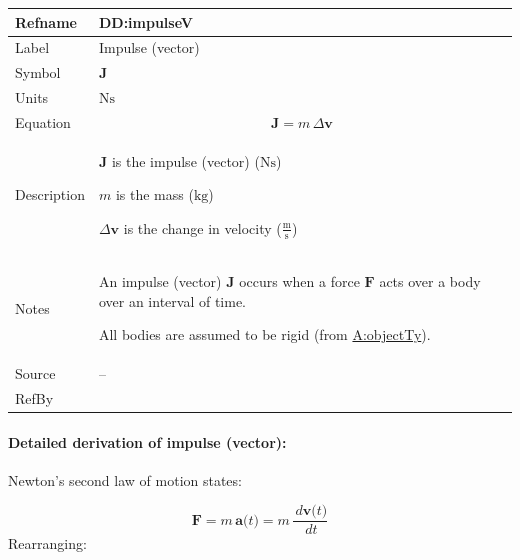\documentclass[12pt]{article}
\begin{document}
\medskip
\noindent
\begin{minipage}{\textwidth}
\begin{tabular}{>{\raggedright}p{}>{\raggedright\arraybackslash}p{}}
\toprule \textbf{Refname} & \textbf{DD:impulseV}
\label{DD:impulseV}
\\ \midrule
Label & Impulse (vector)
        
\\ \midrule
Symbol & $\symbf{J}$
         
\\ \midrule
Units & $\text{N}\text{s}$
        
\\ \midrule
Equation & \begin{displaymath}
           \symbf{J}=m\,Δ\symbf{v}
           \end{displaymath}
\\ \midrule
Description & \begin{symbDescription}
              \item{$\symbf{J}$ is the impulse (vector) ($\text{N}\text{s}$)}
              \item{$m$ is the mass (${\text{kg}}$)}
              \item{$Δ\symbf{v}$ is the change in velocity ($\frac{\text{m}}{\text{s}}$)}
              \end{symbDescription}
\\ \midrule
Notes & An impulse (vector) $\symbf{J}$ occurs when a force $\symbf{F}$ acts over a body over an interval of time.
        
        All bodies are assumed to be rigid (from \hyperref[assumpOT]{A:objectTy}).
        
\\ \midrule
Source & --
         
\\ \midrule
RefBy & 
\\ \bottomrule
\end{tabular}
\end{minipage}

\paragraph{Detailed derivation of impulse (vector):}
\label{DD:impulseVDeriv}
Newton's second law of motion states:

\begin{displaymath}
\symbf{F}=m\,\symbf{a}\text{(}t\text{)}=m\,\frac{\,d\symbf{v}\text{(}t\text{)}}{\,dt}
\end{displaymath}
Rearranging:
\end{document}
